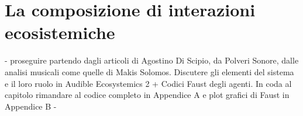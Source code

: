\section{La composizione di interazioni ecosistemiche}
\label{sec:La composizione di interazioni ecosistemiche}

- proseguire partendo dagli articoli di Agostino Di Scipio, da Polveri Sonore,
dalle analisi musicali come quelle di Makis Solomos. Discutere gli elementi del
sistema e il loro ruolo in Audible Ecosystemics 2 + Codici Faust degli agenti.
In coda al capitolo rimandare al codice completo in Appendice A e plot
grafici di Faust in Appendice B -
